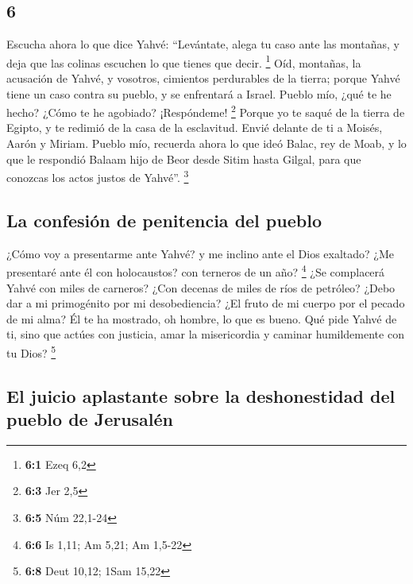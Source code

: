 \begin{paracol}{2}
\hypertarget{section-10}{%
\section{6}\label{section-10}}

 Escucha ahora lo que dice Yahvé: ``Levántate, alega tu
caso ante las montañas, y deja que las colinas escuchen lo que tienes
que decir. \footnote{\textbf{6:1} Ezeq 6,2}  Oíd,
montañas, la acusación de Yahvé, y vosotros, cimientos perdurables de la
tierra; porque Yahvé tiene un caso contra su pueblo, y se enfrentará a
Israel.  Pueblo mío, ¿qué te he hecho? ¿Cómo te he
agobiado? ¡Respóndeme! \footnote{\textbf{6:3} Jer 2,5} 
Porque yo te saqué de la tierra de Egipto, y te redimió de la casa de la
esclavitud. Envié delante de ti a Moisés, Aarón y Miriam. 
Pueblo mío, recuerda ahora lo que ideó Balac, rey de Moab, y lo que le
respondió Balaam hijo de Beor desde Sitim hasta Gilgal, para que
conozcas los actos justos de Yahvé''. \footnote{\textbf{6:5} Núm 22,1-24}

\hypertarget{la-confesiuxf3n-de-penitencia-del-pueblo}{%
\subsection{La confesión de penitencia del
pueblo}\label{la-confesiuxf3n-de-penitencia-del-pueblo}}

 ¿Cómo voy a presentarme ante Yahvé? y me inclino ante el
Dios exaltado? ¿Me presentaré ante él con holocaustos? con terneros de
un año? \footnote{\textbf{6:6} Is 1,11; Am 5,21; Am 1,5-22}
 ¿Se complacerá Yahvé con miles de carneros? ¿Con decenas
de miles de ríos de petróleo? ¿Debo dar a mi primogénito por mi
desobediencia? ¿El fruto de mi cuerpo por el pecado de mi alma?
 Él te ha mostrado, oh hombre, lo que es bueno. Qué pide
Yahvé de ti, sino que actúes con justicia, amar la misericordia y
caminar humildemente con tu Dios? \footnote{\textbf{6:8} Deut 10,12;
  1Sam 15,22}

\hypertarget{el-juicio-aplastante-sobre-la-deshonestidad-del-pueblo-de-jerusaluxe9n}{%
\subsection{El juicio aplastante sobre la deshonestidad del pueblo de
Jerusalén}\label{el-juicio-aplastante-sobre-la-deshonestidad-del-pueblo-de-jerusaluxe9n}}


\end{paracol}

